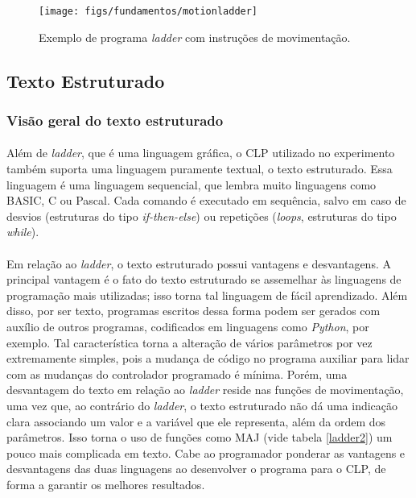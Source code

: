 \begin{figure}[!ht]
  \centering
    \texttt{[image: figs/fundamentos/motionladder]}
    \caption{Exemplo de programa \textit{ladder} com instruções de movimentação.\label{motionladder1}}
\end{figure}

\subsection{Texto Estruturado}
\subsubsection{Visão geral do texto estruturado}
\paragraph{}Além de \textit{ladder}, que é uma linguagem gráfica, o CLP utilizado no experimento também suporta uma linguagem puramente textual, o texto estruturado. Essa linguagem é uma linguagem sequencial, que lembra muito linguagens como BASIC, C ou Pascal. Cada comando é executado em sequência, salvo em caso de desvios (estruturas do tipo \textit{if-then-else}) ou repetições (\textit{loops}, estruturas do tipo \textit{while}).
\paragraph{}Em relação ao \textit{ladder}, o texto estruturado possui vantagens e desvantagens. A principal vantagem é o fato do texto estruturado se assemelhar às linguagens de programação mais utilizadas; isso torna tal linguagem de fácil aprendizado. Além disso, por ser texto, programas escritos dessa forma podem ser gerados com auxílio de outros programas, codificados em linguagens como \textit{Python}, por exemplo. Tal característica torna a alteração de vários parâmetros por vez extremamente simples, pois a mudança de código no programa auxiliar para lidar com as mudanças do controlador programado é mínima. Porém, uma desvantagem do texto em relação ao \textit{ladder} reside nas funções de movimentação, uma vez que, ao contrário do \textit{ladder}, o texto estruturado não dá uma indicação clara associando um valor e a variável que ele representa, além da ordem dos parâmetros. Isso torna o uso de funções como MAJ (vide tabela \ref{ladder2}) um pouco mais complicada em texto. Cabe ao programador ponderar as vantagens e desvantagens das duas linguagens ao desenvolver o programa para o CLP, de forma a garantir os melhores resultados.
